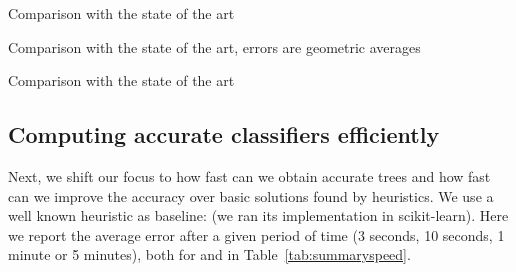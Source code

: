 \documentclass{article}
\begin{document}

\begin{table}[t]
\begin{center}
\begin{footnotesize}
\tabcolsep=3.75pt

\end{footnotesize}
\end{center}
\caption{\label{tab:summaryaccsmall} Comparison with the state of the art}
\end{table}


\begin{table}[t]
\begin{center}
\begin{footnotesize}
\tabcolsep=3.5pt

\end{footnotesize}
\end{center}
\caption{\label{tab:summaryaccsmall} Comparison with the state of the art, errors are geometric averages}
\end{table}

\begin{table}[t]
\begin{center}
\begin{footnotesize}
\tabcolsep=3pt

\end{footnotesize}
\end{center}
\caption{\label{tab:summaryaccsmall} Comparison with the state of the art}
\end{table}






\subsection{Computing accurate classifiers efficiently}

Next, we shift our focus to how fast can we obtain accurate trees and how fast can we improve the accuracy over basic solutions found by heuristics.
We use a well known heuristic as baseline: \cart (we ran its implementation in scikit-learn).
Here we report the average error after a given period of time (3 seconds, 10 seconds, 1 minute or 5 minutes), both for \murtree and \budalg in Table~\ref{tab:summaryspeed}.


\end{document}
